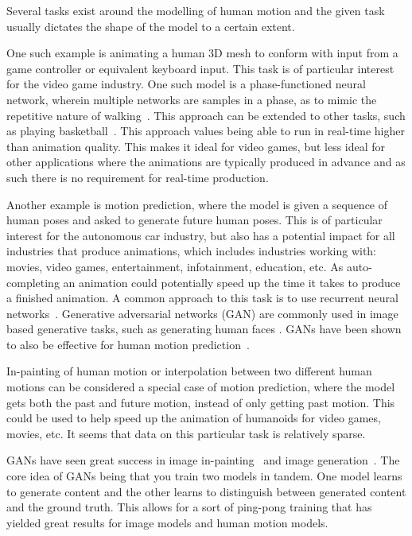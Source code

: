 Several tasks exist around the modelling of human motion and the given task usually dictates the shape of the model to a certain extent.

One such example is animating a human 3D mesh to conform with input from a game controller or equivalent keyboard input. This task is of particular interest for the video game industry. One such model is a phase-functioned neural network, wherein multiple networks are samples in a phase, as to mimic the repetitive nature of walking~\cite{holden2017}. This approach can be extended to other tasks, such as playing basketball~\cite{starke2020}. This approach values being able to run in real-time higher than animation quality. This makes it ideal for video games, but less ideal for other applications where the animations are typically produced in advance and as such there is no requirement for real-time production.

Another example is motion prediction, where the model is given a sequence of human poses and asked to generate future human poses. This is of particular interest for the autonomous car industry, but also has a potential impact for all industries that produce animations, which includes industries working with: movies, video games, entertainment, infotainment, education, etc. As auto-completing an animation could potentially speed up the time it takes to produce a finished animation. A common approach to this task is to use recurrent neural networks~\cite{hu2020predicting, jain2016structuralrnn}. Generative adversarial networks (GAN) are commonly used in image based generative tasks, such as generating human faces \cite{karras2019stylebased}. GANs have been shown to also be effective for human motion prediction~\cite{ruiz2019human}.

In-painting of human motion or interpolation between two different human motions can be considered a special case of motion prediction, where the model gets both the past and future motion, instead of only getting past motion. This could be used to help speed up the animation of humanoids for video games, movies, etc. It seems that data on this particular task is relatively sparse.

GANs have seen great success in image in-painting~\cite{bau2019ganpaint} and image generation~\cite{karras2019stylebased}. The core idea of GANs being that you train two models in tandem. One model learns to generate content and the other learns to distinguish between generated content and the ground truth. This allows for a sort of ping-pong training that has yielded great results for image models and human motion models.

